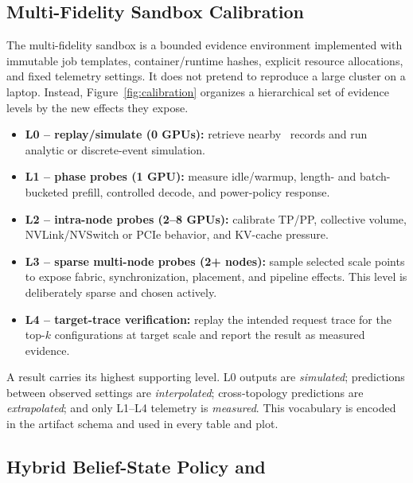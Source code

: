 \subsection{Multi-Fidelity Sandbox Calibration}

The multi-fidelity sandbox is a bounded evidence environment implemented with
immutable job templates, container/runtime hashes, explicit resource
allocations, and fixed telemetry settings.  It does not pretend to reproduce a
large cluster on a laptop.  Instead, Figure~\ref{fig:calibration} organizes a
hierarchical set of evidence levels by the new effects they expose.



\begin{itemize}
    \item \textbf{L0 -- replay/simulate (0 GPUs):} retrieve nearby \bench{}\
    records and run analytic or discrete-event simulation.
    \item \textbf{L1 -- phase probes (1 GPU):} measure idle/warmup, length- and
    batch-bucketed prefill, controlled decode, and power-policy response.
    \item \textbf{L2 -- intra-node probes (2--8 GPUs):} calibrate TP/PP,
    collective volume, NVLink/NVSwitch or PCIe behavior, and KV-cache pressure.
    \item \textbf{L3 -- sparse multi-node probes (2+ nodes):} sample selected
    scale points to expose fabric, synchronization, placement, and pipeline
    effects.  This level is deliberately sparse and chosen actively.
    \item \textbf{L4 -- target-trace verification:} replay the intended request
    trace for the top-$k$ configurations at target scale and report the result
    as measured evidence.
\end{itemize}

A result carries its highest supporting level.  L0 outputs are
\emph{simulated}; predictions between observed settings are \emph{interpolated};
cross-topology predictions are \emph{extrapolated}; and only L1--L4 telemetry
is \emph{measured}.  This vocabulary is encoded in the artifact schema and
used in every table and plot.

\subsection{Hybrid Belief-State Policy and \ipig{}}

